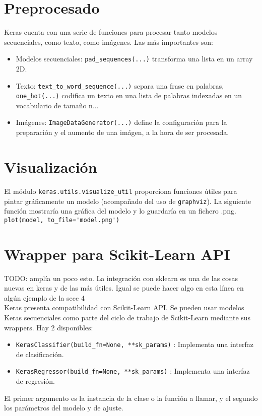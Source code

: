 \section{Preprocesado}
Keras cuenta con una serie de funciones para procesar tanto modelos secuenciales, como texto, como imágenes. Las más importantes son:
\begin{itemize}
\item Modelos secuenciales: \lstinline{pad_sequences(...)} transforma una lista en un array 2D.
\item Texto: \lstinline{text_to_word_sequence(...)} separa una frase en palabras, \lstinline{one_hot(...)} codifica un texto en una lista de palabras indexadas en un vocabulario de tamaño n...
\item Imágenes: \lstinline{ImageDataGenerator(...)} define la configuración para la preparación y el aumento de una imágen, a la hora de ser procesada.
\end{itemize}

\section{Visualización}
El módulo \lstinline{keras.utils.visualize_util} proporciona funciones útiles para pintar gráficamente un modelo (acompañado del uso de \lstinline{graphviz}). La siguiente función mostraría una gráfica del modelo y lo guardaría en un fichero .png.\\
\lstinline{plot(model, to_file='model.png')}
\section{Wrapper para Scikit-Learn API}
TODO: amplía un poco esto. La integración con sklearn es una de las cosas nuevas en keras y de las más útiles. Igual se puede hacer algo en esta línea en algún ejemplo de la secc 4\\
Keras presenta compatibilidad con Scikit-Learn API. Se pueden usar modelos Keras secuenciales como parte del ciclo de trabajo de Scikit-Learn mediante sus wrappers. Hay 2 disponibles:
\begin{itemize}[noitemsep]
\item \lstinline{KerasClassifier(build_fn=None, **sk_params)} : Implementa una interfaz de clasificación.
\item \lstinline{KerasRegressor(build_fn=None, **sk_params)} : Implementa una interfaz de regresión.
\end{itemize}
El primer argumento es la instancia de la clase o la función a llamar, y el segundo los parámetros del modelo y de ajuste.

